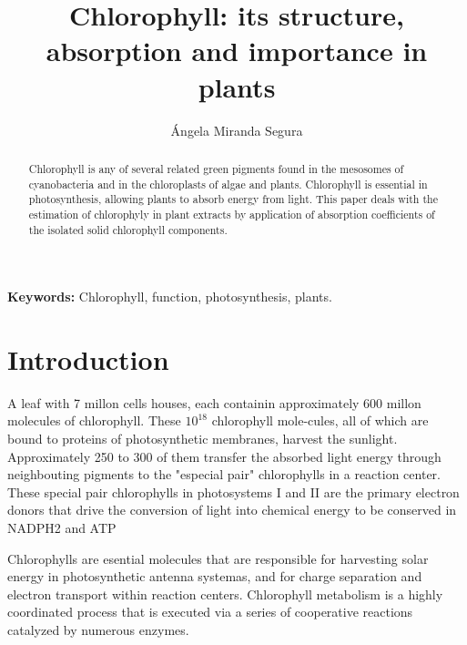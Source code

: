 \documentclass[a4paper, 11pt]{article}
\author{Ángela Miranda Segura}
\title{Chlorophyll: its structure, absorption and importance in plants}
\begin{document}
\maketitle
\begin{minipage}{4cm}
	\textbf{Keywords:}
	Chlorophyll, function, photosynthesis, plants.
\end{minipage}
\begin{minipage}{7cm}
	\begin{abstract}
		Chlorophyll is any of several related green pigments found in the mesosomes of cyanobacteria and in the chloroplasts of algae and plants. Chlorophyll is essential in photosynthesis, allowing plants to absorb energy from light. This paper deals with the estimation of chlorophyly in plant extracts by application of absorption coefficients of the isolated solid chlorophyll components. 
	\end{abstract}
\end{minipage}


\twocolumn
\section{Introduction}
 	A leaf with 7 millon cells houses, each containin approximately 600 millon molecules of chlorophyll. These $10^18$ chlorophyll mole-cules, all of which are bound to proteins of photosynthetic membranes, harvest the sunlight. Approximately 250 to 300 of them transfer the absorbed light energy through neighbouting pigments to the "especial pair" chlorophylls in a reaction center. These special pair chlorophylls in photosystems I and II are the primary electron donors that drive the conversion of light into chemical energy to be conserved in NADPH2 and ATP \cite{VonWettstein1995}
 	

	Chlorophylls are esential molecules that are responsible for harvesting solar energy in photosynthetic antenna systemas, and for charge separation and electron transport within reaction centers. Chlorophyll metabolism is a highly coordinated process that is executed via a series of cooperative reactions catalyzed by numerous enzymes.\\
	
\end{document}
